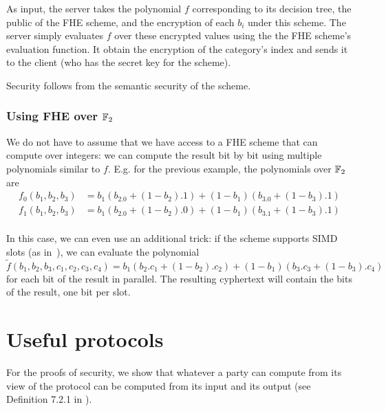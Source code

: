 \documentclass[11pt]{article}
\begin{document}
	As input, the server takes the polynomial $f$ corresponding to its decision tree, the public of the FHE scheme, and the encryption of each $b_i$ under this scheme. The server simply evaluates $f$ over these encrypted values using the the FHE scheme's evaluation function. It obtain the encryption of the category's index and sends it to the client (who has the secret key for the scheme).
	
	Security follows from the semantic security of the scheme. 

\subsubsection{Using FHE over $\mathbb{F}_2$} %
\label{ssub:using_fhe_over_f_2}
We do not have to assume that we have access to a FHE scheme that can compute over integers: we can compute the result bit by bit using multiple polynomials similar to $f$. E.g. for the previous example, the polynomials over $\mathbb{F}_2$ are 
\begin{align*}
	f_0(b_1,b_2,b_3) &= b_1(b_2.0 + (1-b_2).1) + (1-b_1)(b_3.0 + (1-b_3).1) \\
	f_1(b_1,b_2,b_3) &= b_1(b_2.0 + (1-b_2).0) + (1-b_1)(b_3.1 + (1-b_3).1) \\
\end{align*} 

In this case, we can even use an additional trick: if the scheme supports SIMD slots (as in~\cite{GHS12}), we can evaluate the polynomial
	\[
		\tilde{f}(b_1,b_2,b_3,c_1,c_2,c_3,c_4) =  b_1(b_2.c_1 + (1-b_2).c_2) + (1-b_1)(b_3.c_3 + (1-b_3).c_4)
	\]
for each bit of the result in parallel. The resulting cyphertext will contain the bits of the result, one bit per slot.      




\section{Useful protocols} %
\label{sec:useful_protocols}

For the proofs of security, we show that whatever a party can compute from its view of the protocol can be computed from its input and its output (see Definition 7.2.1 in \cite{Goldreich2}).                                
\end{document}
